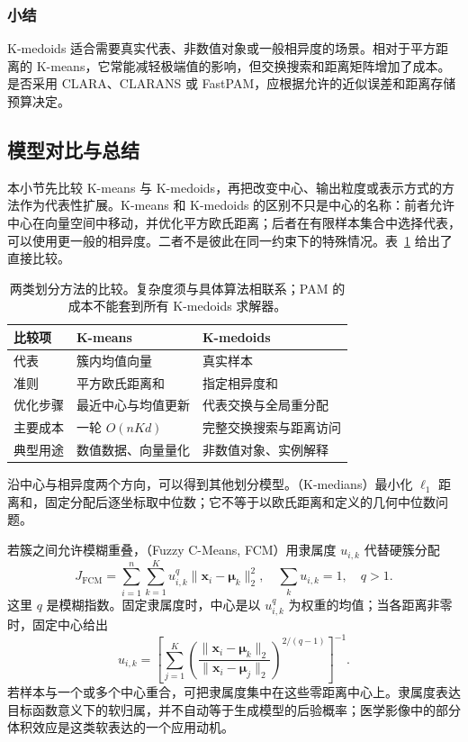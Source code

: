 \subsubsection{小结}

K-medoids 适合需要真实代表、非数值对象或一般相异度的场景。相对于平方距离的 K-means，它常能减轻极端值的影响，但交换搜索和距离矩阵增加了成本。是否采用 CLARA、CLARANS 或 FastPAM，应根据允许的近似误差和距离存储预算决定。

\subsection{模型对比与总结}

本小节先比较 K-means 与 K-medoids，再把改变中心、输出粒度或表示方式的方法作为代表性扩展。K-means 和 K-medoids 的区别不只是中心的名称：前者允许中心在向量空间中移动，并优化平方欧氏距离；后者在有限样本集合中选择代表，可以使用更一般的相异度。二者不是彼此在同一约束下的特殊情况。表~\ref{tab:clustering-partition} 给出了直接比较。

\begin{table}[htbp]
 \small
 \begin{tabularx}{\linewidth}{@{}l>{\RaggedRight\arraybackslash}X>{\RaggedRight\arraybackslash}X@{}}
 \toprule
 比较项 & K-means & K-medoids\\
 \midrule
 代表 & 簇内均值向量 & 真实样本\\
 准则 & 平方欧氏距离和 & 指定相异度和\\
 优化步骤 & 最近中心与均值更新 & 代表交换与全局重分配\\
 主要成本 & 一轮 $O(nKd)$ & 完整交换搜索与距离访问\\
 典型用途 & 数值数据、向量量化 & 非数值对象、实例解释\\
 \bottomrule
 \end{tabularx}
 \caption{两类划分方法的比较。复杂度须与具体算法相联系；PAM 的成本不能套到所有 K-medoids 求解器。}
 \label{tab:clustering-partition}
\end{table}

沿中心与相异度两个方向，可以得到其他划分模型。（K-medians）最小化 $\ell_1$ 距离和，固定分配后逐坐标取中位数；它不等于以欧氏距离和定义的几何中位数问题。

\Needspace{45mm}
若簇之间允许模糊重叠，（Fuzzy C-Means, FCM）用隶属度 $u_{i,k}$ 代替硬簇分配
\begin{equation}
 J_{\mathrm{FCM}}
 =\sum_{i=1}^n\sum_{k=1}^K
 u_{i,k}^{q}\lVert\bm{x}_i-\bm{\mu}_k\rVert_2^2,
 \quad \sum_k u_{i,k}=1,\quad q>1.
 \label{eq:clustering-fcm}
\end{equation}
这里 $q$ 是模糊指数。固定隶属度时，中心是以 $u_{i,k}^q$ 为权重的均值；当各距离非零时，固定中心给出
\[
 u_{i,k}=
 \left[
 \sum_{j=1}^K
 \left(\frac{\lVert\bm{x}_i-\bm{\mu}_k\rVert_2}
 {\lVert\bm{x}_i-\bm{\mu}_j\rVert_2}\right)^{2/(q-1)}
 \right]^{-1}.
\]
若样本与一个或多个中心重合，可把隶属度集中在这些零距离中心上。隶属度表达目标函数意义下的软归属，并不自动等于生成模型的后验概率；医学影像中的部分体积效应是这类软表达的一个应用动机。

